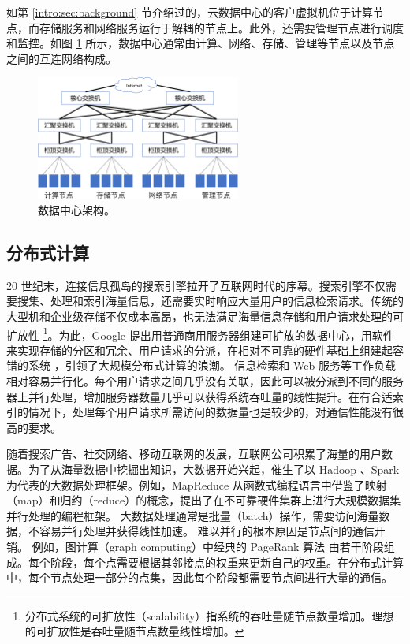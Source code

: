 如第 \ref{intro:sec:background} 节介绍过的，云数据中心的客户虚拟机位于计算节点，而存储服务和网络服务运行于解耦的节点上。此外，还需要管理节点进行调度和监控。如图 \ref{background:fig:cloud-architecture} 所示，数据中心通常由计算、网络、存储、管理等节点以及节点之间的互连网络构成。



\begin{figure}[htbp]
	\centering
	\includegraphics[width=0.6\textwidth]{figures/DC_arch.pdf}
	\caption{数据中心架构。}
	\label{background:fig:cloud-architecture}
\end{figure}





\subsection{分布式计算}
\label{background:sec:datacenter-distributed}


20 世纪末，连接信息孤岛的搜索引擎拉开了互联网时代的序幕。搜索引擎不仅需要搜集、处理和索引海量信息，还需要实时响应大量用户的信息检索请求。传统的大型机和企业级存储不仅成本高昂，也无法满足海量信息存储和用户请求处理的可扩放性 \footnote{分布式系统的可扩放性（scalability）指系统的吞吐量随节点数量增加。理想的可扩放性是吞吐量随节点数量线性增加。}。为此，Google 提出用普通商用服务器组建可扩放的数据中心，用软件来实现存储的分区和冗余、用户请求的分派，在相对不可靠的硬件基础上组建起容错的系统 \cite{ghemawat2003google,chang2008bigtable,dean2008mapreduce}，引领了大规模分布式计算的浪潮。
信息检索和 Web 服务等工作负载相对容易并行化。每个用户请求之间几乎没有关联，因此可以被分派到不同的服务器上并行处理，增加服务器数量几乎可以获得系统吞吐量的线性提升。在有合适索引的情况下，处理每个用户请求所需访问的数据量也是较少的，对通信性能没有很高的要求。

随着搜索广告、社交网络、移动互联网的发展，互联网公司积累了海量的用户数据。为了从海量数据中挖掘出知识，大数据开始兴起，催生了以 Hadoop \cite{white2012hadoop}、Spark \cite{zaharia2010spark} 为代表的大数据处理框架。例如，MapReduce \cite{dean2008mapreduce} 从函数式编程语言中借鉴了映射（map）和归约（reduce）的概念，提出了在不可靠硬件集群上进行大规模数据集并行处理的编程框架。
大数据处理通常是批量（batch）操作，需要访问海量数据，不容易并行处理并获得线性加速。
难以并行的根本原因是节点间的通信开销。
例如，图计算（graph computing）中经典的 PageRank 算法 \cite{page1999pagerank} 由若干阶段组成。每个阶段，每个点需要根据其邻接点的权重来更新自己的权重。在分布式计算中，每个节点处理一部分的点集，因此每个阶段都需要节点间进行大量的通信。

